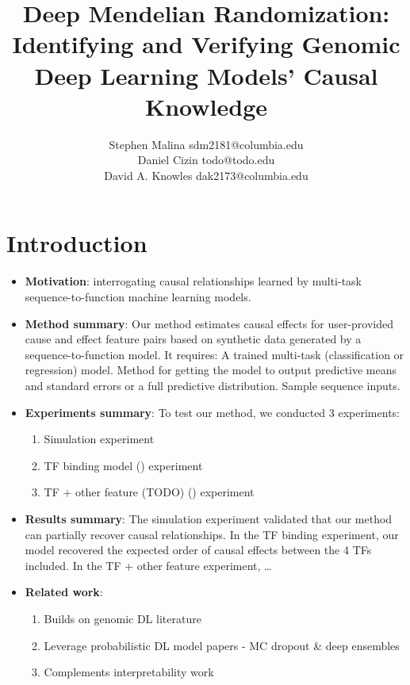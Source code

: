 \documentclass[twoside,11pt]{article}
\begin{document}
\title{Deep Mendelian Randomization: Identifying and Verifying Genomic Deep Learning Models' Causal Knowledge}

\author{\name Stephen Malina \email sdm2181@columbia.edu \\
       \AND
	\name Daniel Cizin \email todo@todo.edu \\
       \AND
       \name David A. Knowles \email dak2173@columbia.edu}
       


\maketitle

\section{Introduction}
\begin{itemize}
	\item \textbf{Motivation}: interrogating causal relationships learned by multi-task sequence-to-function machine learning models.
	\item \textbf{Method summary}: Our method estimates causal effects for user-provided cause and effect feature pairs based on synthetic data generated by a sequence-to-function model. It requires:
		\subitem A trained multi-task (classification or regression) model.
		\subitem Method for getting the model to output predictive means and standard errors or a full predictive distribution.
		\subitem Sample sequence inputs.
	\item \textbf{Experiments summary}: To test our method, we conducted 3 experiments:
		\begin{enumerate}
			\item Simulation experiment
			\item TF binding model (\cite{avsec2020base}) experiment
			\item TF + other feature (TODO) (\cite{zhou2015predicting}) experiment
		\end{enumerate}
	\item \textbf{Results summary}: The simulation experiment validated that our method can partially recover causal relationships. In the TF binding experiment, our model recovered the expected order of causal effects between the 4 TFs included. In the TF + other feature experiment, \dots
	\item \textbf{Related work}: 
		\begin{enumerate}
			\item Builds on genomic DL literature
			\item Leverage probabilistic DL model papers - MC dropout \& deep ensembles
			\item Complements interpretability work
		\end{enumerate} 
\end{itemize}
\end{document}
